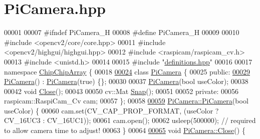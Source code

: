 \hypertarget{PiCamera_8hpp_source}{\section{Pi\+Camera.\+hpp}
\label{PiCamera_8hpp_source}
}

\begin{DoxyCode}
00001 
00007 \textcolor{preprocessor}{#ifndef PiCamera\_H}
00008 \textcolor{preprocessor}{#define PiCamera\_H}
00009 
00010 \textcolor{preprocessor}{#include <opencv2/core/core.hpp>}
00011 \textcolor{preprocessor}{#include <opencv2/highgui/highgui.hpp>}
00012 \textcolor{preprocessor}{#include <raspicam/raspicam\_cv.h>}
00013 \textcolor{preprocessor}{#include <unistd.h>}
00014 
00015 \textcolor{preprocessor}{#include "\hyperlink{definitions_8hpp}{definitions.hpp}"}
00016 
00017 \textcolor{keyword}{namespace }\hyperlink{namespaceChipChipArray}{ChipChipArray} \{
00018 
\hypertarget{PiCamera_8hpp_source_l00024}{}\hyperlink{classChipChipArray_1_1PiCamera}{00024}     \textcolor{keyword}{class }\hyperlink{classChipChipArray_1_1PiCamera}{PiCamera} \{
00025         \textcolor{keyword}{public}:
\hypertarget{PiCamera_8hpp_source_l00029}{}\hyperlink{classChipChipArray_1_1PiCamera_a5910a3284877677decb6529d88e43487}{00029}             \hyperlink{classChipChipArray_1_1PiCamera_a5910a3284877677decb6529d88e43487}{PiCamera}() : \hyperlink{classChipChipArray_1_1PiCamera}{PiCamera}(true) \{\};
00030             
00037             \hyperlink{classChipChipArray_1_1PiCamera_a5910a3284877677decb6529d88e43487}{PiCamera}(\textcolor{keywordtype}{bool} useColor);
00038             
00042             \textcolor{keywordtype}{void} \hyperlink{classChipChipArray_1_1PiCamera_a38f8205921d6deec5a2c360ea7d24cc5}{Close}();
00043 
00050             cv::Mat \hyperlink{classChipChipArray_1_1PiCamera_a58fb0de02570dce9a9cb60a1a04fb84f}{Snap}();
00051 
00052         \textcolor{keyword}{private}:
00056             raspicam::RaspiCam\_Cv cam;
00057     \};
00058 
\hypertarget{PiCamera_8hpp_source_l00059}{}\hyperlink{classChipChipArray_1_1PiCamera_a0a4480e9e7475ae7af9a7523239caf8d}{00059}     \hyperlink{classChipChipArray_1_1PiCamera_a5910a3284877677decb6529d88e43487}{PiCamera::PiCamera}(\textcolor{keywordtype}{bool} useColor) \{
00060         cam.set(CV\_CAP\_PROP\_FORMAT, (useColor ? CV\_16UC3 : CV\_16UC1));
00061         cam.open();
00062         usleep(500000);  \textcolor{comment}{// required to allow camera time to adjust!}
00063     \}
00064 
\hypertarget{PiCamera_8hpp_source_l00065}{}\hyperlink{classChipChipArray_1_1PiCamera_a38f8205921d6deec5a2c360ea7d24cc5}{00065}     \textcolor{keywordtype}{void} \hyperlink{classChipChipArray_1_1PiCamera_a38f8205921d6deec5a2c360ea7d24cc5}{PiCamera::Close}() \{

\end{DoxyCode}
